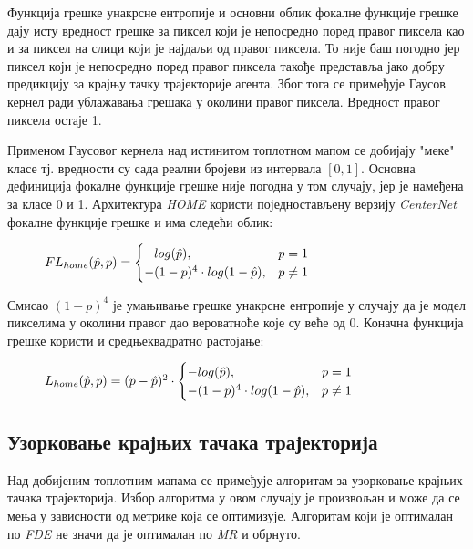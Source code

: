 \documentclass[11pt,oneside]{memoir}
\begin{document}
Функција грешке унакрсне ентропије и основни облик фокалне функције грешке дају исту вредност грешке за пиксел који је непосредно поред правог пиксела као и за
пиксел на слици који је најдаљи од правог пиксела. То није баш погодно јер пиксел који је непосредно поред правог пиксела такође 
представља јако добру предикцију за крајњу тачку трајекторије агента. 
Због тога се примеђује Гаусов кернел ради ублажавања грешака у околини правог пиксела.
Вредност правог пиксела остаје 1.

Применом Гаусовог кернела над истинитом топлотном мапом се добијају "меке" класе тј. вредности су сада реални бројеви из интервала $[0, 1]$. 
Основна дефиниција фокалне функције грешке није погодна у том случају, јер је намеђена за класе 0 и 1. Архитектура \textit{HOME} користи
поједностављену верзију \textit{CenterNet} фокалне функције грешке и има следећи облик:

\begin{figure}[H]
  \centering
  $ FL_{home}(\hat{p}, p) =
  \begin{cases}
    \centering
    -log(\hat{p}) , & p = 1 \\
    -(1-p)^{4}\cdot log(1-\hat{p}), & p \neq 1
  \end{cases}
  $
\end{figure}

Смисао $(1-p)^4$ је умањивање грешке унакрсне ентропије у случају да је модел пикселима у околини правог дао вероватноће које су веће од 0.
Коначна функција грешке користи и средњеквадратно растојање:

\begin{figure}[H]
  \centering
  $ L_{home}(\hat{p}, p) = (p - \hat{p})^{2} \cdot
  \begin{cases}
    \centering
    -log(\hat{p}) , & p = 1 \\
    -(1-p)^{4}\cdot log(1-\hat{p}), & p \neq 1
  \end{cases}
  $
\end{figure}

\subsection{Узорковање крајњих тачака трајекторија}

Над добијеним топлотним мапама се примеђује алгоритам за узорковање крајњих тачака трајекторија. Избор алгоритма у овом случају
је произвољан и може да се мења у зависности од метрике која се оптимизује. Алгоритам који је оптималан по \textit{FDE}
не значи да је оптималан по \textit{MR} и обрнуто. 
\end{document}
